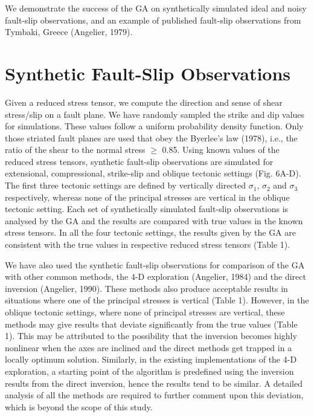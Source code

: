 \onehalfspacing
We demonstrate the success of the GA on synthetically simulated ideal and noisy fault-slip observations, and an example of published fault-slip observations from Tymbaki, Greece (Angelier, 1979).

\section{Synthetic Fault-Slip Observations}
Given a reduced stress tensor, we compute the direction and sense of shear stress/slip on a fault plane. We have randomly sampled the strike and dip values for simulations. These values follow a uniform probability density function. Only those striated fault planes are used that obey the Byerlee’s law (1978), i.e., the ratio of the shear to the normal stress $\ge$ 0.85. Using known values of the reduced stress tensors, synthetic fault-slip observations are simulated for extensional, compressional, strike-slip and oblique tectonic settings (Fig. 6A-D). The first three tectonic settings are defined by vertically directed $\sigma_{1}$, $\sigma_{2}$ and $\sigma_{3}$ respectively, whereas none of the principal stresses are vertical in the oblique tectonic setting. Each set of synthetically simulated fault-slip observations is analysed by the GA and the results are compared with true values in the known stress tensors. In all the four tectonic settings, the results given by the GA are consistent with the true values in respective reduced stress tensors (Table 1).

We have also used the synthetic fault-slip observations for comparison of the GA with other common methods, the 4-D exploration (Angelier, 1984) and the direct inversion (Angelier, 1990). These methods also produce acceptable results in situations where one of the principal stresses is vertical (Table 1). However, in the oblique tectonic settings, where none of principal stresses are vertical, these methods may give results that deviate significantly from the true values (Table 1). This may be attributed to the possibility that the inversion becomes highly nonlinear when the axes are inclined and the direct methods get trapped in a locally optimum solution. Similarly, in the existing implementations of the 4-D exploration, a starting point of the algorithm is predefined using the inversion results from the direct inversion, hence the results tend to be similar. A detailed analysis of all the methods are required to further comment upon this deviation, which is beyond the scope of this study.

